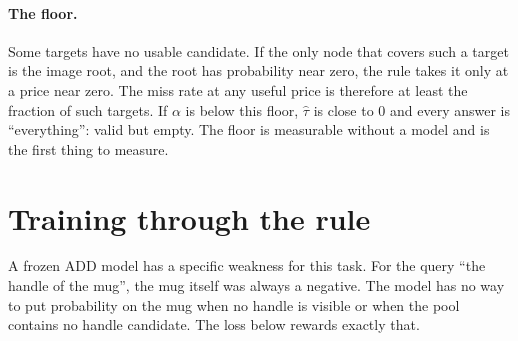 \documentclass[11pt,a4paper]{article}
\theoremstyle{definition}
\theoremstyle{remark}
\begin{document}
\paragraph{The floor.} Some targets have no usable candidate. If the only node that covers such a target is the image
root, and the root has probability near zero, the rule takes it only at a price near zero. The miss rate at any
useful price is therefore at least the fraction of such targets. If $\alpha$ is below this floor, $\hat\tau$ is
close to $0$ and every answer is ``everything'': valid but empty. The floor is measurable without a model and is the
first thing to measure.

\section{Training through the rule}
\label{sec:training}
A frozen ADD model has a specific weakness for this task. For the query ``the handle of the mug'', the mug itself
was always a negative. The model has no way to put probability on the mug when no handle is visible or when the
pool contains no handle candidate. The loss below rewards exactly that.
\end{document}
